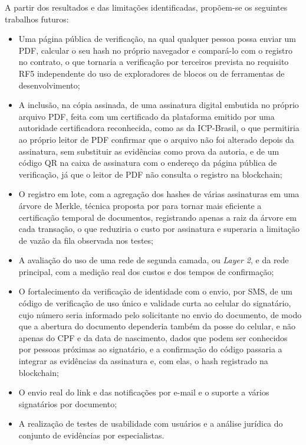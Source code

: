 \documentclass[
    12pt,
    a4paper,
    oneside,
    chapter=TITLE,
    section=TITLE,
    subsection=TITLE,
    subsubsection=TITLE,
    sumario=tradicional,
    english,
    brazil
]{abntex2}
\begin{document}
A partir dos resultados e das limitações identificadas, propõem-se os seguintes trabalhos futuros:
\begin{itemize}
\item Uma página pública de verificação, na qual qualquer pessoa possa enviar um PDF, calcular o seu hash no próprio navegador e compará-lo com o registro no contrato, o que tornaria a verificação por terceiros prevista no requisito RF5 independente do uso de exploradores de blocos ou de ferramentas de desenvolvimento;
\item A inclusão, na cópia assinada, de uma assinatura digital embutida no próprio arquivo PDF, feita com um certificado da plataforma emitido por uma autoridade certificadora reconhecida, como as da ICP-Brasil, o que permitiria ao próprio leitor de PDF confirmar que o arquivo não foi alterado depois da assinatura, sem substituir as evidências como prova da autoria, e de um código QR na caixa de assinatura com o endereço da página pública de verificação, já que o leitor de PDF não consulta o registro na blockchain;
\item O registro em lote, com a agregação dos hashes de várias assinaturas em uma árvore de Merkle, técnica proposta por  para tornar mais eficiente a certificação temporal de documentos, registrando apenas a raiz da árvore em cada transação, o que reduziria o custo por assinatura e superaria a limitação de vazão da fila observada nos testes;
\item A avaliação do uso de uma rede de segunda camada, ou \emph{Layer 2}, e da rede principal, com a medição real dos custos e dos tempos de confirmação;
\item O fortalecimento da verificação de identidade com o envio, por SMS, de um código de verificação de uso único e validade curta ao celular do signatário, cujo número seria informado pelo solicitante no envio do documento, de modo que a abertura do documento dependeria também da posse do celular, e não apenas do CPF e da data de nascimento, dados que podem ser conhecidos por pessoas próximas ao signatário, e a confirmação do código passaria a integrar as evidências da assinatura e, com elas, o hash registrado na blockchain;
\item O envio real do link e das notificações por e-mail e o suporte a vários signatários por documento;
\item A realização de testes de usabilidade com usuários e a análise jurídica do conjunto de evidências por especialistas.
\end{itemize}
\end{document}
